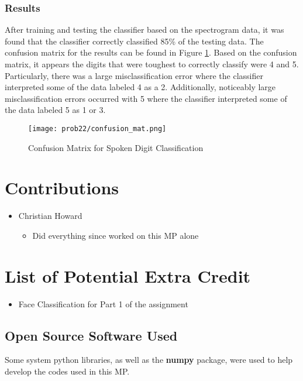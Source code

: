 \documentclass{article}[12pt]
\begin{document}
   \subsubsection{Results}
   After training and testing the classifier based on the spectrogram data, it was found that the classifier correctly classified 85\% of the testing data. The confusion matrix for the results can be found in Figure \ref{fig:cm22}. Based on the confusion matrix, it appears the digits that were toughest to correctly classify were 4 and 5. Particularly, there was a large misclassification error where the classifier interpreted some of the data labeled 4 as a 2. Additionally, noticeably large misclassification errors occurred with 5 where the classifier interpreted some of the data labeled 5 as 1 or 3.
   
   \begin{figure}[!htb]
   	\centering
   	\texttt{[image: prob22/confusion\_mat.png]}
   	\caption{Confusion Matrix for Spoken Digit Classification}
   	\label{fig:cm22}
   \end{figure}

\newpage
\section{Contributions}
\begin{itemize}
\item Christian Howard
	\begin{itemize}
	\item Did everything since worked on this MP alone
	\end{itemize}
\end{itemize}   
   
   
\newpage
   \section{List of Potential Extra Credit}
   \begin{itemize}
   \item Face Classification for Part 1 of the assignment
\end{itemize}      
   
   \newpage
\begin{appendices}

   \section{Open Source Software Used}
   Some system python libraries, as well as the \textbf{numpy} package, were used to help develop the codes used in this MP.

\end{appendices}   
   
   
   
\end{document}
